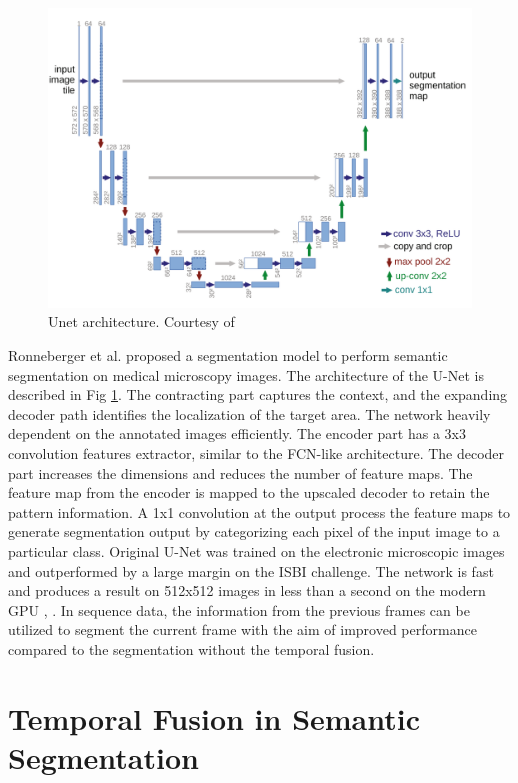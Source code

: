     \begin{figure}[h]
    	\centering
    	\includegraphics[width=14cm]{images/unet.png}
    	\caption{Unet architecture. Courtesy of \cite{70_ronneberger2015u}}
    	\label{fig:unet}
    \end{figure} 
	
	 Ronneberger et al. \cite{70_ronneberger2015u} proposed a segmentation model to perform semantic segmentation on medical microscopy images. The architecture of the U-Net is described in Fig \ref{fig:unet}. The contracting part captures the context, and the expanding decoder path identifies the localization of the target area. The network heavily dependent on the annotated images efficiently. The encoder part has a 3x3 convolution features extractor, similar to the FCN-like architecture. The decoder part increases the dimensions and reduces the number of feature maps. The feature map from the encoder is mapped to the upscaled decoder to retain the pattern information. A 1x1 convolution at the output process the feature maps to generate segmentation output by categorizing each pixel of the input image to a particular class. Original U-Net was trained on the electronic microscopic images and outperformed by a large margin on the ISBI challenge. The network is fast and produces a result on 512x512 images in less than a second on the modern GPU \cite{70_ronneberger2015u}, \cite{60_minaee2021image}. In sequence data, the information from the previous frames can be utilized to segment the current frame with the aim of improved performance compared to the segmentation without the temporal fusion. 
	 
    \section{Temporal Fusion in Semantic Segmentation}
    
